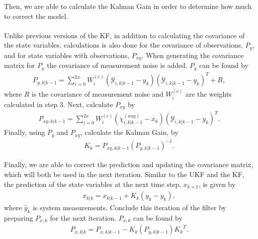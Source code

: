 \begin{enumerate}
              
       Then, we are able to calculate the Kalman Gain in order to determine how much to correct the model. \\ \\
       Unlike previous versions of the KF, in addition to calculating the covariance of the state variables, calculations is also done for the covariance of observations, $P_{y}$, and for state variables with observations, $P_{xy}$. When generating the covariance matrix for $P_{y}$ the covariance of measurement noise is added. $P_{y}$ can be found by
        \begin{align*}
       P_{y, k | k-1} = \sum^{2x}_{i = 0} W_i^{(c)} (\mathcal{Y}_{i, k | k - 1} -   y_{k} )(\mathcal{Y}_{i, k | k - 1} -  y_{k} )^T + R,
       \end{align*}
       where $R$ is the covariance of measurement noise and $W_i^{(c)} $ are the weights calculated in step 3. Next, calculate $P_{xy}$ by
        \begin{align*}
       P_{xy, k | k-1} = \sum^{2x}_{i = 0} W_i^{(c)} (\chi^{(aug)}_{i, k | k - 1} -   x_{k } )(\mathcal{Y}_{i, k | k - 1} -  y_{ k } )^T .
       \end{align*}
       Finally, using $P_{y}$ and $P_{xy}$, calculate the Kalman Gain, by
       \begin{align*}
       K_k = P_{xy, k | k-1} (P_{y, k | k-1}) ^{-1}.
       \end{align*}
        
        
        
      \noindent Finally, we are able to correct the prediction and updating the covariance matrix, which will both be used in the next iteration. Similar to the UKF and the KF, the prediction of the state variables at the next time step, $x_{k+1}$, is given by 
      \begin{align*}
        x_{k|k} = x_{k|k-1} + K_k(\hat y_k - y_{k}),
        \end{align*}
        where $\hat{y}_k$ is system measurements. Conclude this iteration of the filter by preparing $ P_{x, k} $ for the next iteration.  $P_{x, k} $ can be found by
       \begin{align*}
       P_{x, k|k} = P_{x, k|k-1} -K_k (P_{y, k | k-1} ) {K_k}^T.
       \end{align*}     
  
  \end{enumerate}          
    
\newpage        

